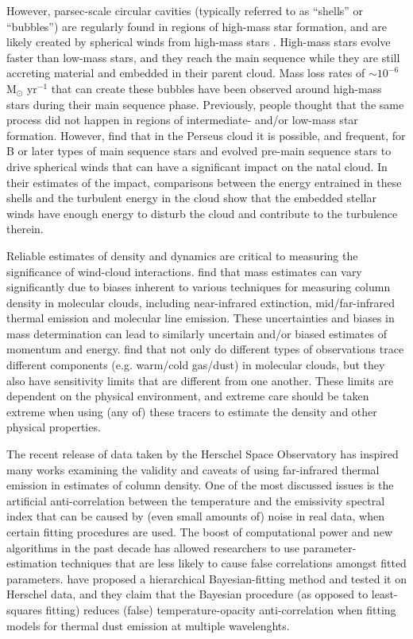 \documentclass[11pt,a4paper]{emulateapj}
\begin{document}
However, parsec-scale circular cavities (typically referred to as ``shells'' or ``bubbles'') are regularly found in regions of high-mass star formation, and are likely created by spherical winds from high-mass stars \citep{Churchwell_2006,Churchwell_2007,Beaumont_2010}. High-mass stars evolve faster than low-mass stars, and they reach the main sequence while they are still accreting material and embedded in their parent cloud. Mass loss rates of $\sim 10^{-6}$ M$_{\odot}$ yr$^{-1}$ that can create these bubbles have been observed around high-mass stars during their main sequence phase. Previously, people thought that the same process did not happen in regions of intermediate- and/or low-mass star formation. However, \citet{Arce_2011} find that in the Perseus cloud it is possible, and frequent, for B or later types of main sequence stars and evolved pre-main sequence stars to drive spherical winds that can have a significant impact on the natal cloud. In their estimates of the impact, comparisons between the energy entrained in these shells and the turbulent energy in the cloud show that the embedded stellar winds have enough energy to disturb the cloud and contribute to the turbulence therein.

Reliable estimates of density and  dynamics are critical to measuring the significance of wind-cloud interactions. \citet{Goodman_2009} find that mass estimates can vary significantly due to biases inherent to various techniques for measuring column density in molecular clouds, including near-infrared extinction, mid/far-infrared thermal emission and molecular line emission.  These uncertainties and biases in mass determination can lead to similarly uncertain and/or biased estimates of momentum and energy.  \citet{Goodman_2009} find that not only do different types of observations trace different components (e.g. warm/cold gas/dust) in molecular clouds, but they also have sensitivity limits that are different from one another. These limits are dependent on the physical environment, and extreme care should be taken extreme when using (any of) these tracers to estimate the density and other physical properties.

The recent release of data taken by the Herschel Space Observatory has inspired many works examining the validity and caveats of using far-infrared thermal emission in estimates of column density. One of the most discussed issues is the artificial anti-correlation between the temperature and the emissivity spectral index that can be caused by (even small amounts of) noise in real data, when certain fitting procedures are used. The boost of computational power and new algorithms in the past decade has allowed researchers to use parameter-estimation techniques that are less likely to cause false correlations amongst fitted parameters.  \citet{Kelly_2012} have proposed a hierarchical Bayesian-fitting method and tested it on  Herschel data, and they claim that the Bayesian procedure (as opposed to least-squares fitting) reduces (false) temperature-opacity anti-correlation when fitting models for thermal dust emission at multiple wavelenghts.
\end{document}
